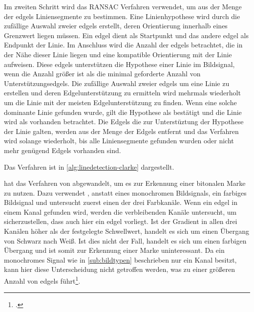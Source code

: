 Im zweiten Schritt wird das RANSAC Verfahren verwendet, um aus der Menge der \glspl{edgel} Liniensegmente zu bestimmen.
 Eine Linienhypothese wird durch die zufällige Auswahl zweier \glspl{edgel} erstellt, deren Orientierung innerhalb
 eines Grenzwert liegen müssen. Ein \gls{edgel} dient als Startpunkt und das andere \gls{edgel} als Endpunkt der Linie.
 Im Anschluss wird die Anzahl der \glspl{edgel} betrachtet, die in der Nähe dieser Linie liegen und eine kompatible
 Orientierung mit der Linie aufweisen. Diese \glspl{edgel} unterstützen die Hypothese einer Linie im Bildsignal, wenn
 die Anzahl größer ist als die minimal geforderte Anzahl von Unterstützungsedgels. Die zufällige Auswahl zweier
 \glspl{edgel} um eine Linie zu erstellen und deren Edgelunterstützung zu ermitteln wird mehrmals wiederholt um die
 Linie mit der meisten Edgelunterstützung zu finden. Wenn eine solche dominante Linie gefunden wurde, gilt die
 Hypothese als bestätigt und die Linie wird als vorhanden betrachtet. Die Edgels die zur Unterstüztung der Hypothese
 der Linie galten, werden aus der Menge der Edgels entfernt und das Verfahren wird solange wiederholt, bis alle
 Liniensegmente gefunden wurden oder nicht mehr genügend Edgels vorhanden sind.

Das Verfahren ist in \autoref{alg:linedetection-clarke} dargestellt.



\citeauthor{hirzer08} hat das Verfahren von \citeauthor{clarke96} abgewandelt, um es zur Erkennung einer bitonalen
 Marke zu nutzen. Dazu verwendet \citeauthor{hirzer08}, anstatt eines monochromen Bildsignals, ein farbiges Bildsignal
 und untersucht zuerst einen der drei Farbkanäle. Wenn ein \gls{edgel} in einem Kanal gefunden wird, werden die
 verbleibenden Kanäle untersucht, um sicherzustellen, dass auch hier ein \gls{edgel} vorliegt. Ist der Gradient in
 allen drei Kanälen höher als der festgelegte Schwellwert, handelt es sich um einen Übergang  von Schwarz nach Weiß.
 Ist dies nicht der Fall, handelt es sich um einen farbigen Übergang und ist somit zur Erkennung einer Marke
 uninteressant. Da ein monochromes Signal wie in \autoref{sub:bildtypen} beschrieben nur ein Kanal besitzt, kann hier
 diese Unterscheidung nicht getroffen werden, was zu einer größeren Anzahl von \glspl{edgel}
 führt\footcite[Vgl.][S.~6--7]{hirzer08}.




